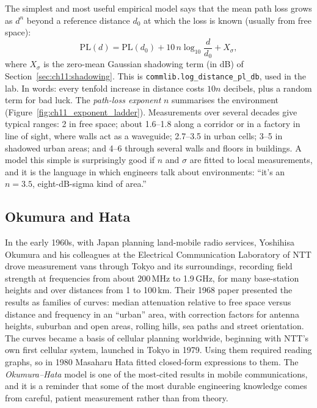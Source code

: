 The simplest and most useful empirical model says that the mean path loss grows as $d^n$ beyond a
reference distance $d_0$ at which the loss is known (usually from free space):
\begin{equation}
\mathrm{PL}(d)=\mathrm{PL}(d_0)+10\,n\log_{10}\frac{d}{d_0}+X_\sigma ,
\label{eq:ch11:logdist}
\end{equation}
where $X_\sigma$ is the zero-mean Gaussian shadowing term (in dB) of
Section~\ref{sec:ch11:shadowing}. This is \texttt{commlib.log\_distance\_pl\_db}, used in the lab.
In words: every tenfold increase in distance costs $10n$ decibels, plus a random term for bad luck.
The \emph{path-loss exponent} $n$ summarises the environment (Figure~\ref{fig:ch11_exponent_ladder}).
Measurements over several decades give typical ranges: 2 in free space; about 1.6--1.8 along a
corridor or in a factory in line of sight, where walls act as a waveguide; 2.7--3.5 in urban cells;
3--5 in shadowed urban areas; and 4--6 through several walls and floors in buildings. A model this
simple is surprisingly good if $n$ and $\sigma$ are fitted to local measurements, and it is the
language in which engineers talk about environments: ``it's an $n=3.5$, eight-dB-sigma kind of
area.''


\subsection{Okumura and Hata}

\begin{history}
In the early 1960s, with Japan planning land-mobile radio services, Yoshihisa Okumura and his
colleagues at the Electrical Communication Laboratory of NTT drove measurement vans through Tokyo
and its surroundings, recording field strength at frequencies from about 200\,MHz to 1.9\,GHz,
for many base-station heights and over distances from 1 to 100\,km. Their 1968 paper presented the
results as families of curves: median attenuation relative to free space versus distance and
frequency in an ``urban'' area, with correction factors for antenna heights, suburban and open
areas, rolling hills, sea paths and street orientation. The curves became a basis of cellular
planning worldwide, beginning with NTT's own first cellular system, launched in Tokyo in 1979.
Using them required reading graphs, so in 1980 Masaharu Hata fitted closed-form expressions to
them. The \emph{Okumura--Hata} model is one of the most-cited results in mobile communications,
and it is a reminder that some of the most durable engineering knowledge comes from careful,
patient measurement rather than from theory.
\end{history}

